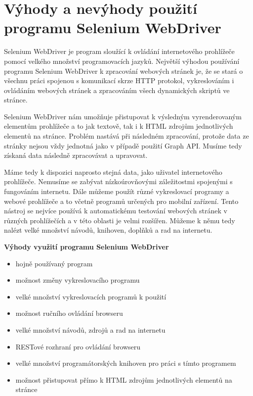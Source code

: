\documentclass[thesis=M,czech]{FITthesis}[2013/05/10]
\begin{document}
\section{Výhody a nevýhody použití programu Selenium WebDriver}

Selenium WebDriver je program sloužící k ovládání internetového prohlížeče pomocí velkého množství programovacích jazyků. Největší výhodou používání programu Selenium WebDriver k zpracování webových stránek je, že se stará o všechnu práci spojenou s komunikací skrze HTTP protokol, vykreslováním i ovládáním webových stránek a zpracováním všech dynamických skriptů ve stránce. 

Selenium WebDriver nám umožňuje přistupovat k výsledným vyrenderovaným elementům prohlížeče a to jak textově, tak i k HTML zdrojům jednotlivých elementů na stránce. Problém nastává při následném zpracování, protože data ze stránky nejsou vždy jednotná jako v případě použití Graph API. Musíme tedy získaná data následně zpracovávat a upravovat.

Máme tedy k dispozici naprosto stejná data, jako uživatel internetového prohlížeče. Nemusíme se zabývat nízkoúrovňovými záležitostmi spojenými s fungováním internetu. Dále můžeme použít různé vykreslovací programy a webové prohlížeče a to včetně programů určených pro mobilní zařízení. Tento nástroj se nejvíce používá k automatickému testování webových stránek v různých prohlížečích a v této oblasti je velmi rozšířen. Můžeme k němu tedy nalézt velké množství návodů, knihoven, doplňků a rad na internetu. 

\textbf{Výhody využití programu Selenium WebDriver}

\begin{itemize}
  \item hojně používaný program
  \item možnost změny vykreslovacího programu
  \item velké množství vykreslovacích programů k použití
  \item možnost ručního ovládání browseru
  \item velké množství návodů, zdrojů a rad na internetu
  \item RESTové rozhraní pro ovládání browseru
  \item velké množství programátorských knihoven pro práci s tímto programem
  \item možnost přistupovat přímo k HTML zdrojům jednotlivých elementů na stránce
\end{itemize}
\end{document}
